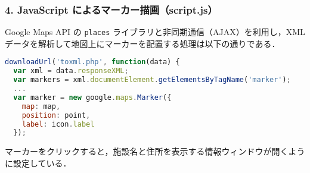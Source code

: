 \subsubsection*{4. JavaScript によるマーカー描画（script.js）}

Google Maps API の \texttt{places} ライブラリと非同期通信（AJAX）を利用し，XML データを解析して地図上にマーカーを配置する処理は以下の通りである．

\begin{lstlisting}[language=javascript]
downloadUrl('toxml.php', function(data) {
  var xml = data.responseXML;
  var markers = xml.documentElement.getElementsByTagName('marker');
  ...
  var marker = new google.maps.Marker({
    map: map,
    position: point,
    label: icon.label
  });
\end{lstlisting}

マーカーをクリックすると，施設名と住所を表示する情報ウィンドウが開くように設定している．

